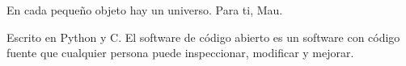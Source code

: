 \thispagestyle{empty}
{\small
	En cada pequeño objeto hay un universo. Para ti, Mau.
\strut\vfill %
\noindent Escrito en Python y C. El software de código abierto es un software con código fuente que cualquier persona puede inspeccionar, modificar y mejorar.
}
\clearpage
